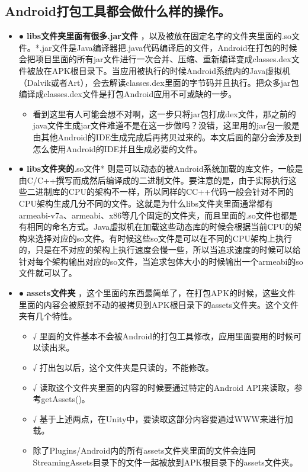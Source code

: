 \documentclass[9pt, b5paper]{article}
\begin{document}
\subsection{Android打包工具都会做什么样的操作。}
\label{sec-3-1}
\begin{itemize}
\item ● \textbf{libs文件夹里面有很多.jar文件} ，以及被放在固定名字的文件夹里面的.so文件。*.jar文件是Java编译器把.java代码编译后的文件，Android在打包的时候会把项目里面的所有jar文件进行一次合并、压缩、重新编译变成classes.dex文件被放在APK根目录下。当应用被执行的时候Android系统内的Java虚拟机（Dalvik或者Art），会去解读classes.dex里面的字节码并且执行。把众多jar包编译成classes.dex文件是打包Android应用不可或缺的一步。
\begin{itemize}
\item 看到这里有人可能会想不对啊，这一步只将jar包打成dex文件，那之前的java文件生成jar文件难道不是在这一步做吗？没错，这里用的jar包一般是由其他Android的IDE生成完成后再拷贝过来的。本文后面的部分会涉及到怎么使用Android的IDE并且生成必要的文件。
\end{itemize}
\item ● \textbf{libs文件夹的}.so文件* 则是可以动态的被Android系统加载的库文件，一般是由C/C++撰写而成然后编译成的二进制文件。要注意的是，由于实际执行这些二进制库的CPU的架构不一样，所以同样的CC++代码一般会针对不同的CPU架构生成几分不同的文件。这就是为什么libs文件夹里面通常都有armeabi-v7a、armeabi、x86等几个固定的文件夹，而且里面的.so文件也都是有相同的命名方式。Java虚拟机在加载这些动态库的时候会根据当前CPU的架构来选择对应的so文件。有时候这些so文件是可以在不同的CPU架构上执行的，只是在不对应的架构上执行速度会慢一些，所以当追求速度的时候可以给针对每个架构输出对应的so文件，当追求包体大小的时候输出一个armeabi的so文件就可以了。
\item ● \textbf{assets文件夹} ，这个里面的东西最简单了，在打包APK的时候，这些文件里面的内容会被原封不动的被拷贝到APK根目录下的assets文件夹。这个文件夹有几个特性。
\begin{itemize}
\item √ 里面的文件基本不会被Android的打包工具修改，应用里面要用的时候可以读出来。
\item √ 打出包以后，这个文件夹是只读的，不能修改。
\item √ 读取这个文件夹里面的内容的时候要通过特定的Android API来读取，参考getAssets()。
\item √ 基于上述两点，在Unity中，要读取这部分内容要通过WWW来进行加载。
\item 除了Plugins/Android内的所有assets文件夹里面的文件会连同StreamingAssets目录下的文件一起被放到APK根目录下的assets文件夹。

\end{itemize}
\end{itemize}
\end{document}
